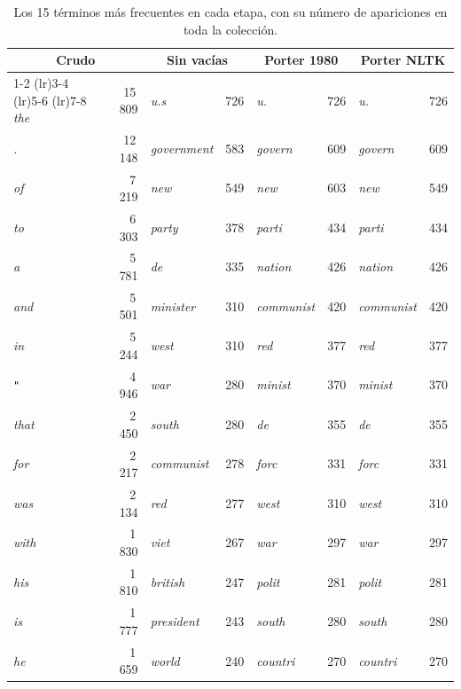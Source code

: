 \documentclass[11pt,letterpaper]{article}
\begin{document}
\begin{table}[H]
  \centering
  \footnotesize
  \begin{tabular}{lr lr lr lr}
    \toprule
    \multicolumn{2}{c}{\textbf{Crudo}} &
    \multicolumn{2}{c}{\textbf{Sin vacías}} &
    \multicolumn{2}{c}{\textbf{Porter 1980}} &
    \multicolumn{2}{c}{\textbf{Porter NLTK}} \\
    \cmidrule(lr){1-2} \cmidrule(lr){3-4}
    \cmidrule(lr){5-6} \cmidrule(lr){7-8}
    \emph{the} & 15\,809 & \emph{u.s} & 726 &
      \emph{u.} & 726 & \emph{u.} & 726 \\
    \emph{.} & 12\,148 & \emph{government} & 583 &
      \emph{govern} & 609 & \emph{govern} & 609 \\
    \emph{of} & 7\,219 & \emph{new} & 549 &
      \emph{new} & 603 & \emph{new} & 549 \\
    \emph{to} & 6\,303 & \emph{party} & 378 &
      \emph{parti} & 434 & \emph{parti} & 434 \\
    \emph{a} & 5\,781 & \emph{de} & 335 &
      \emph{nation} & 426 & \emph{nation} & 426 \\
    \emph{and} & 5\,501 & \emph{minister} & 310 &
      \emph{communist} & 420 & \emph{communist} & 420 \\
    \emph{in} & 5\,244 & \emph{west} & 310 &
      \emph{red} & 377 & \emph{red} & 377 \\
    \emph{\texttt{"}} & 4\,946 & \emph{war} & 280 &
      \emph{minist} & 370 & \emph{minist} & 370 \\
    \emph{that} & 2\,450 & \emph{south} & 280 &
      \emph{de} & 355 & \emph{de} & 355 \\
    \emph{for} & 2\,217 & \emph{communist} & 278 &
      \emph{forc} & 331 & \emph{forc} & 331 \\
    \emph{was} & 2\,134 & \emph{red} & 277 &
      \emph{west} & 310 & \emph{west} & 310 \\
    \emph{with} & 1\,830 & \emph{viet} & 267 &
      \emph{war} & 297 & \emph{war} & 297 \\
    \emph{his} & 1\,810 & \emph{british} & 247 &
      \emph{polit} & 281 & \emph{polit} & 281 \\
    \emph{is} & 1\,777 & \emph{president} & 243 &
      \emph{south} & 280 & \emph{south} & 280 \\
    \emph{he} & 1\,659 & \emph{world} & 240 &
      \emph{countri} & 270 & \emph{countri} & 270 \\
    \bottomrule
  \end{tabular}
  \caption{Los 15 términos más frecuentes en cada etapa, con su
    número de apariciones en toda la colección.}
  \label{tab:top15}
\end{table}
\end{document}
